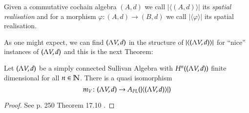  \begin{Definition}
  Given a commutative cochain algebra $(A,d)$ we call $| \langle (A,d) \rangle |$ its \emph{spatial realisation} and for
  a morphism $\varphi \colon (A,d) \to (B,d)$ we call $|\langle \varphi \rangle|$ its spatial realisation.
 \end{Definition}

 As one might expect, we can find $(\Lambda V,d)$ in the structure of  $| \langle (\Lambda V,d) \rangle |$ for ``nice'' 
 instances of $(\Lambda V,d)$ and this is the next Theorem:
 
 \begin{Theorem}
  Let $(\Lambda V,d)$ be a simply connected Sullivan Algebra with $H^n((\Lambda V,d))$ finite dimensional for all $n \in \mathbb{N}$.
  There is a quasi isomorphism
  $$m_V \colon (\Lambda V,d) \to A_{PL}(| \langle (\Lambda V,d) \rangle |)$$
 \end{Theorem}

 \begin{proof}
 See \cite{Felix2001} p. 250 Theorem 17.10 .
  
 \end{proof}

 
 